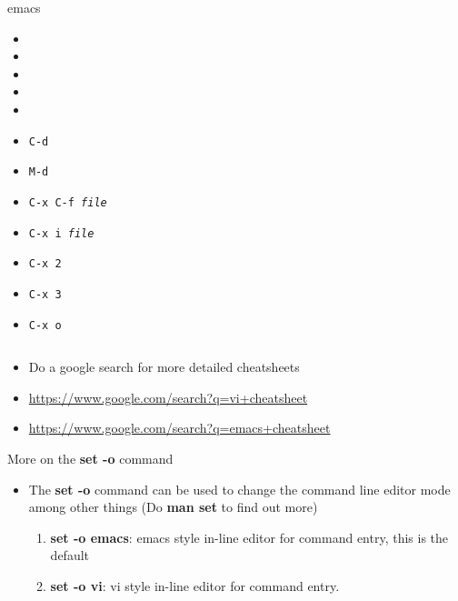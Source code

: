 \documentclass[c,compress,xcolor=svgnames]{beamer}
\newenvironment{bblock}[0]
{
\begin{beamerboxesrounded}[upper=uppercol1,lower=lowercol1,shadow=true]}
{\end{beamerboxesrounded}}
\newenvironment{eblock}[0]
{
\begin{beamerboxesrounded}[upper=uppercol2,lower=lowercol2,shadow=true]}
{\end{beamerboxesrounded}}
\begin{document}
\begin{frame}[allowframebreaks]
{\begin{columns}
\begin{eblock}{emacs}
    \begin{itemize}
      \item 
      \item 
      \item 
      \item
      \item
      \item \texttt{C-d}
      \item \texttt{M-d}
      \item \texttt{C-x C-f \textit{file}}
      \item \texttt{C-x i \textit{file}}
      \item \texttt{C-x 2}
      \item \texttt{C-x 3}
      \item \texttt{C-x o}
    \end{itemize}
    \end{eblock}
  \end{columns}
  }
  \framebreak
  \begin{itemize}
    \item Do a google search for more detailed cheatsheets
    \item[\texttt{vi}] \url{https://www.google.com/search?q=vi+cheatsheet}
    \item[\texttt{emacs}] \url{https://www.google.com/search?q=emacs+cheatsheet}
  \end{itemize}
  \begin{bblock}{More on the \textbf{set -o} command}
    \begin{itemize}
      \item The \textbf{\color{dkgreen}set -o} command can be used to change the command line editor mode among other things (Do \textbf{\color{dkgreen}man set\Enter} to find out more)
      \begin{enumerate}
        \item \textbf{\color{dkgreen}set -o emacs}: emacs style in-line editor for command entry, this is the default
        \item \textbf{\color{dkgreen}set -o vi}: vi style in-line editor for command entry.
      \end{enumerate}
    \end{itemize}
  \end{bblock}
\end{frame}
\end{document}
